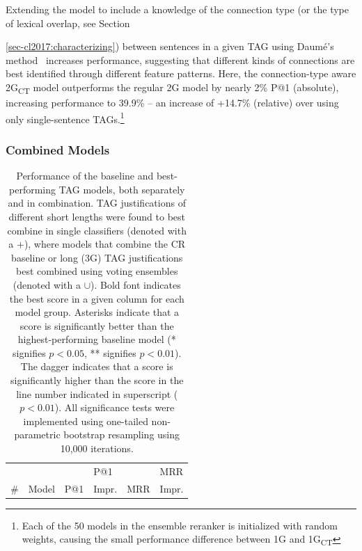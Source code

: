 Extending the model to include a knowledge of the connection type (or the type of lexical overlap, see Section~{\ref{sec-cl2017:characterizing}) between sentences in a given TAG using Daum{\'e}'s method~\cite{daume2007} increases performance, suggesting that different kinds of connections are best identified through different feature patterns.  Here, the connection-type aware 2G\textsubscript{CT} model outperforms the regular 2G model by nearly 2\% P@1 (absolute), increasing performance to 39.9\% -- an increase of +14.7\% (relative) over using only single-sentence TAGs.\footnote{Each of the 50 models in the ensemble reranker is initialized with random weights, causing the small performance difference between 1G and 1G\textsubscript{CT}}





\subsubsection{Combined Models}
\label{sec-cl2017:combinedmodels}
%
%
\begin{table}[t]
    \small
    \caption{{
Performance of the baseline and best-performing TAG models, both separately and in combination. TAG justifications of different short lengths were found to best combine in single classifiers (denoted with a $+$), where models that combine the CR baseline or long (3G) TAG justifications best combined using voting ensembles (denoted with a $\cup$). Bold font indicates the best score in a given column for each model group. Asterisks indicate that a score is significantly better than the highest-performing baseline model (* signifies $p < 0.05$, ** signifies $p < 0.01$).  The dagger indicates that a score is significantly higher than the score in the line number indicated in superscript ($p < 0.01$). All significance tests were implemented using one-tailed non-parametric bootstrap resampling using 10,000 iterations. }}
\begin{center}
\begin{tabular}{p{0.3mm}p{55mm}llll}
\multicolumn{1}{l}{ } & \multicolumn{1}{l}{ } & \multicolumn{1}{l}{ } & \multicolumn{1}{l}{P@1} & \multicolumn{1}{l}{ } & \multicolumn{1}{l}{MRR} \\
\multicolumn{1}{l}{\#} & \multicolumn{1}{l}{ Model } & \multicolumn{1}{l}{P@1} & \multicolumn{1}{l}{Impr.} & \multicolumn{1}{l}{MRR} & \multicolumn{1}{l}{Impr.} \\


\end{tabular}
\end{center}
\end{table}}
